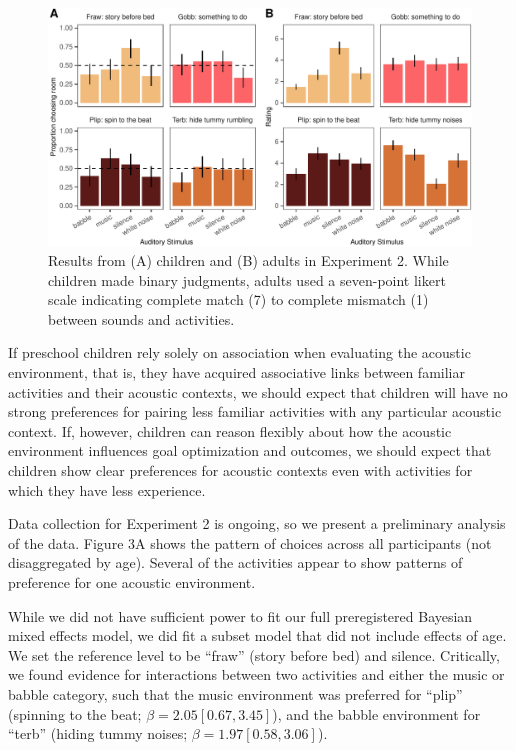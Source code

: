 \documentclass[10pt, letterpaper]{article}
\newenvironment{CodeChunk}{}{}
\begin{document}
\begin{CodeChunk}
\begin{figure}[t]

{\centering \includegraphics{figs/e4-summary-fig-1} 

}

\caption[Results from (A) children and (B) adults in Experiment 2]{Results from (A) children and (B) adults in Experiment 2. While children made binary judgments, adults used a seven-point likert scale indicating complete match (7) to complete mismatch (1) between sounds and activities.}\label{fig:e4-summary-fig}
\end{figure}
\end{CodeChunk}

If preschool children rely solely on association when evaluating the
acoustic environment, that is, they have acquired associative links
between familiar activities and their acoustic contexts, we should
expect that children will have no strong preferences for pairing less
familiar activities with any particular acoustic context. If, however,
children can reason flexibly about how the acoustic environment
influences goal optimization and outcomes, we should expect that
children show clear preferences for acoustic contexts even with
activities for which they have less experience.

Data collection for Experiment 2 is ongoing, so we present a preliminary
analysis of the data. Figure 3A shows the pattern of choices across all
participants (not disaggregated by age). Several of the activities
appear to show patterns of preference for one acoustic environment.

While we did not have sufficient power to fit our full preregistered
Bayesian mixed effects model, we did fit a subset model that did not
include effects of age. We set the reference level to be ``fraw'' (story
before bed) and silence. Critically, we found evidence for interactions
between two activities and either the music or babble category, such
that the music environment was preferred for ``plip'' (spinning to the
beat; \(\beta = 2.05 [0.67, 3.45]\)), and the babble environment for
``terb'' (hiding tummy noises; \(\beta = 1.97 [0.58, 3.06]\)).
\end{document}
